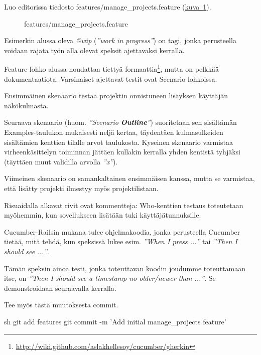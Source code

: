 \documentclass{article}
\newenvironment{myfigure}{
  \begin{figure}
    \centering
    \begin{lrbox}{\myfigurebox}
      \begin{minipage}{0.8\textwidth}
}{
      \end{minipage}
    \end{lrbox}
    \fcolorbox{blue}{blue!1}{\usebox{\myfigurebox}}
  \end{figure}
}
\newcommand{\en}[1]{\foreignlanguage{english}{#1}}
\begin{document}
Luo editorissa tiedosto \en{features/manage\_projects.feature}
(\hyperref[fig:manage-projects-feature]{kuva~\ref*{fig:manage-projects-feature}}).

\begin{myfigure}
\caption{\en{features/manage\_projects.feature}}
\label{fig:manage-projects-feature}
\end{myfigure}

Esimerkin alussa oleva {\em @wip} ({\em ''\en{work in progress}''}) on tagi,
jonka perusteella voidaan rajata työn alla olevat speksit ajettavaksi kerralla.

\en{Feature}-lohko alussa noudattaa tiettyä
formaattia\footnote{\url{http://wiki.github.com/aslakhellesoy/cucumber/gherkin}},
mutta on pelkkää dokumentaatiota. Varsinaiset ajettavat testit ovat
\en{Scenario}-lohkoissa.

Ensimmäinen skenaario testaa projektin onnistuneen lisäyksen käyttäjän
näkökulmasta.

Seuraava skenaario (huom. {\em ''\en{Scenario {\bf Outline}}''}) suoritetaan
sen sisältämän \en{Examples}-taulukon mukaisesti neljä kertaa, täydentäen
kulmasulkeiden sisältämien kenttien tilalle arvot taulukosta. Kyseinen
skenaario varmistaa virheenkäsittelyn toiminnan jättäen kullakin kerralla yhden
kentistä tyhjäksi (täyttäen muut validilla arvolla {\em ''x''}).

Viimeinen skenaario on samankaltainen ensimmäisen kanssa, mutta se varmistaa,
että lisätty projekti ilmestyy myös projektilistaan.

Risuaidalla alkavat rivit ovat kommentteja: \en{Who}-kenttien testaus
toteutetaan myöhemmin, kun sovellukseen lisätään tuki käyttäjätunnuksille.

Cucumber-Railsin mukana tulee ohjelmakoodia, jonka perusteella \en{Cucumber}
tietää, mitä tehdä, kun speksissä lukee esim. {\em ''\en{When I press ...}''}
tai {\em ''\en{Then I should see ...}''}.

Tämän speksin ainoa testi, jonka toteuttavan koodin joudumme toteuttamaan itse,
on {\em ''\en{Then I should see a timestamp no older/newer than ...}''}. Se
demonstroidaan seuraavalla kerralla.

\begin{samepage}
Tee myös tästä muutoksesta commit.

\begin{pygmented}{sh}
git add features
git commit -m 'Add initial manage_projects feature'
\end{pygmented}
\end{samepage}
\end{document}
